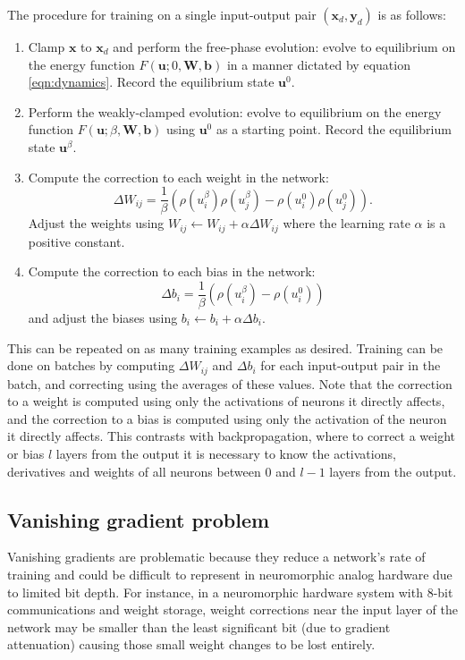 \documentclass[utf8]{frontiersSCNS}
\newcommand{\mtx}[1]{\mathbf{#1}}
\begin{document}
The procedure for training on a single input-output pair $(\mtx{x}_d,\mtx{y}_d)$ is as follows:
\begin{enumerate}
\item Clamp $\mtx{x}$ to $\mtx{x}_d$ and perform the free-phase evolution: evolve to equilibrium on the energy function $F(\mtx{u}; 0, \mtx{W}, \mtx{b})$ in a manner dictated by equation \ref{eqn:dynamics}. Record the equilibrium state $\mtx{u}^0$.
\item Perform the weakly-clamped evolution: evolve to equilibrium on the energy function $F(\mtx{u}; \beta, \mtx{W}, \mtx{b})$ using $\mtx{u}^0$ as a starting point. Record the equilibrium state $\mtx{u}^{\beta}$.
\item Compute the correction to each weight in the network: 
\begin{equation}
\Delta W_{ij}=\frac{1}{\beta}(\rho(u_i^\beta)\rho(u_j^\beta)-\rho(u_i^0)\rho(u_j^0)). \label{eqn:weight_correction}
\end{equation}
Adjust the weights using $W_{ij}\leftarrow W_{ij}+\alpha\Delta W_{ij}$ where the learning rate $\alpha$ is a positive constant.
\item Compute the correction to each bias in the network:
\begin{equation}
\Delta b_i=\frac{1}{\beta}(\rho(u_i^{\beta})-\rho(u_i^0)) \label{eqn:bias_correction}
\end{equation}
and adjust the biases using $b_i\leftarrow b_i+\alpha\Delta b_i$.
\end{enumerate}
This can be repeated on as many training examples as desired. Training can be done on batches by computing $\Delta W_{ij}$ and $\Delta b_i$ for each input-output pair in the batch, and correcting using the averages of these values. Note that the correction to a weight is computed using only the activations of neurons it directly affects, and the correction to a bias is computed using only the activation of the neuron it directly affects. This contrasts with backpropagation, where to correct a weight or bias $l$ layers from the output it is necessary to know the activations, derivatives and weights of all neurons between $0$ and $l-1$ layers from the output.

\subsection{Vanishing gradient problem}
\label{sec:vangrad}

Vanishing gradients are problematic because they reduce a network's rate of training and could be difficult to represent in neuromorphic analog hardware due to limited bit depth. For instance, in a neuromorphic hardware system with 8-bit communications and weight storage, weight corrections near the input layer of the network may be smaller than the least significant bit (due to gradient attenuation) causing those small weight changes to be lost entirely.
\end{document}
